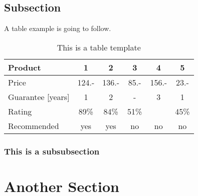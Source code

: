 \subsection{Subsection}

A table example is going to follow.

\begin{table}[H]
\centering
\caption{This is a table template}
\begin{tabular}{|l|c|c|c|c|c|}
\hline
Product & 1 & 2 & 3 & 4 & 5\\
\hline
Price & 124.- & 136.- & 85.- & 156.- & 23.-\\
Guarantee [years] & 1 & 2 & - & 3 & 1\\
Rating & 89\% & 84\% & 51\% & & 45\%\\
\hline
\hline
Recommended & yes & yes & no & no & no\\
\hline
\end{tabular}
\label{tab:template2}
\end{table}
\subsubsection{This is a subsubsection}
\section{Another Section}